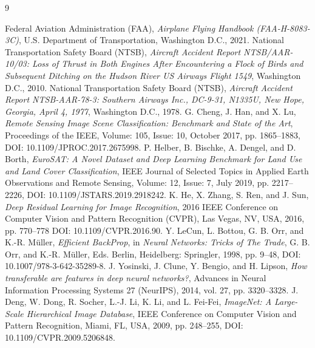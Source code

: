\documentclass[12pt, a4paper]{report}
\begin{document}
\begin{thebibliography}{9}

  Federal Aviation Administration (FAA),
  \emph{Airplane Flying Handbook (FAA-H-8083-3C)}, U.S. Department of Transportation, Washington D.C., 2021.
  National Transportation Safety Board (NTSB),
  \emph{Aircraft Accident Report NTSB/AAR-10/03: Loss of Thrust in Both Engines After Encountering a Flock of Birds and Subsequent Ditching on the Hudson River US Airways Flight 1549}, Washington D.C., 2010.
    National Transportation Safety Board (NTSB),
    \emph{Aircraft Accident Report NTSB-AAR-78-3: Southern Airways Inc., DC-9-31, N1335U, New Hope, Georgia, April 4, 1977}, Washington D.C., 1978.
    G. Cheng, J. Han, and X. Lu,
    \emph{Remote Sensing Image Scene Classification: 
    Benchmark and State of the Art}, Proceedings of the IEEE, Volume: 105, Issue: 10, October 2017, pp. 1865--1883, DOI: 10.1109/JPROC.2017.2675998.
    P. Helber, B. Bischke, A. Dengel, and D. Borth,
    \emph{EuroSAT: A Novel Dataset and Deep Learning
    Benchmark for Land Use and Land Cover
    Classification}, IEEE Journal of Selected Topics in Applied Earth Observations and Remote Sensing, Volume: 12, Issue: 7, July 2019, pp. 2217--2226, DOI: 10.1109/JSTARS.2019.2918242.
    K. He, X. Zhang, S. Ren, and J. Sun,
    \emph{Deep Residual Learning for Image Recognition}, 2016 IEEE Conference on Computer Vision and Pattern Recognition (CVPR), Las Vegas, NV, USA, 2016, pp. 770--778 DOI: 10.1109/CVPR.2016.90.
    Y. LeCun, L. Bottou, G. B. Orr, and K.-R. M\"{u}ller,
    \emph{Efficient BackProp}, in \emph{Neural Networks: Tricks of The Trade}, G. B. Orr, and K.-R. M\"{u}ller, Eds. Berlin, Heidelberg: Springler, 1998, pp. 9--48, DOI: 10.1007/978-3-642-35289-8.
    J. Yosinski, J. Clune, Y. Bengio, and H. Lipson,
    \emph{How transferable are features in deep neural
    networks?}, Advances in Neural Information Processing Systems 27 (NeurIPS), 2014, vol. 27, pp. 3320--3328.
    J. Deng, W. Dong, R. Socher, L.-J. Li, K. Li, and L. Fei-Fei,
    \emph{ImageNet: A Large-Scale Hierarchical Image Database}, IEEE Conference on Computer Vision and Pattern Recognition, Miami, FL, USA, 2009, pp. 248--255, DOI: 10.1109/CVPR.2009.5206848.

\end{thebibliography}
\end{document}
